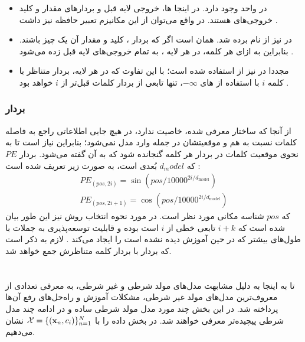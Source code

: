 \begin{itemize}
	\item
	      در \decoder{} واحد \multiheadattention{} وجود دارد. در اینجا \query{} ها، خروجی لایه قبل \decoder{} و بردارهای مقدار و کلید خروجی‌های \encoder{} هستند. در واقع می‌توان از این مکانیزم تعبیر حافظه نیز داشت \cite{transformer}.
	\item
	      در \encoder{} نیز از \multiheadselfattention{} نام برده شد. \multiheadselfattention{} همان \multiheadattention{} است اگر که بردار \query{}، کلید و مقدار آن یک چیز باشند. بنابراین به ازای هر کلمه، در هر لایه \encoder{}، به تمام خروجی‌های لایه قبل \multiheadselfattention{} زده می‌شود \cite{transformer}.
	\item
	      مجددا در \decoder{} نیز از \multiheadselfattention{} استفاده شده است؛ با این تفاوت که در هر لایه، بردار متناظر با کلمه $i$ با استفاده از \mask{}‌های $-\infty$، تنها تابعی از بردار کلمات قبل‌تر از $i$ خواهد بود \cite{transformer}.
\end{itemize}

\subsubsection{بردار
	}
از آنجا که ساختار معرفی شده، خاصیت \recurrence{} ندارد، در هیچ جایی اطلاعاتی راجع به فاصله کلمات نسبت به هم و موقعیتشان در جمله وارد مدل نمی‌شود؛ بنابراین نیاز است تا به نحوی موقعیت کلمات در بردار \embedding{} هر کلمه گنجانده شود که به آن \positionalembedding{} گفته می‌شود. بردار \positionalembedding{}
$PE$
که $d_model$ بُعدی است، به صورت زیر تعریف شده است \cite{transformer}:
\begin{align}
	PE_{(pos, 2i)} = \sin ( pos / 10000^{2i/d_\text{model}}) \nonumber
	\\
	PE_{(pos, 2i+1)} = \cos ( pos / 10000^{2i/d_\text{model}})
\end{align}
که $pos$ شناسه مکانی مورد نظر است. در مورد نحوه انتخاب روش \encoding{} نیز این طور بیان شده است که
\positionalembedding{}  $i+k$
تابعی خطی از
\positionalembedding{} $i$
است بوده و قابلیت توسعه‌پذیری به جملات با طول‌های بیشتر که در حین آموزش دیده نشده است را ایجاد می‌کند \cite{transformer}. لازم به ذکر است که بردار \positionalembedding{} با بردار \embedding{} کلمه متناظرش جمع خواهد شد.

\section{\condtg}
تا به اینجا به دلیل مشابهت مدل‌های مولد شرطی و غیر شرطی، به معرفی تعدادی از معروف‌ترین مدل‌های مولد غیر شرطی، مشکلات آموزش و راه‌حل‌های رفع آن‌ها پرداخته شد. در این بخش چند مورد مدل مولد شرطی ساده و در ادامه چند مدل شرطی پیچیده‌تر معرفی خواهند شد. در بخش داده را با ${\mathcal{X}} = \{({\bf x}_n, c_i)\}_{n=1}^N$ نشان می‌دهیم.
